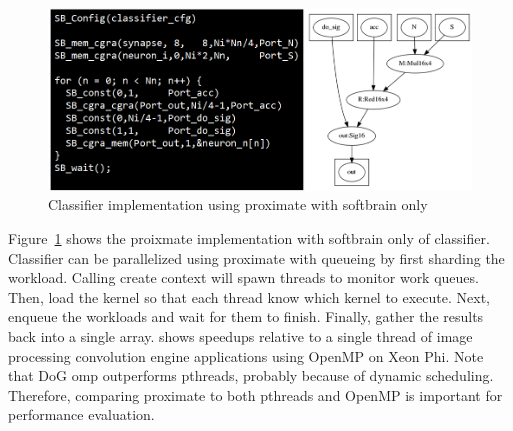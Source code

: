 \begin{figure}
  \begin{center}
    \includegraphics[width=\linewidth]{cs758-figs/classifier-prx_sb_only.png}
  \end{center}
\vspace{-0.2in}
  \caption{Classifier implementation using proximate with softbrain only}
  \label{fig:classifier-prx_sb_only}
\vspace{-0.05in}
\end{figure}

Figure~\ref{fig:classifier-prx_sb_only} shows the proixmate implementation 
with softbrain only of classifier. Classifier can be parallelized 
using proximate with queueing by first sharding the workload. Calling create context 
will spawn threads to monitor work queues. Then, load the kernel so that each thread
know which kernel to execute. Next, enqueue the workloads and wait for them to finish. 
Finally, gather the results back into a single array. 
shows speedups relative to a single 
thread of image processing convolution engine applications using OpenMP on Xeon 
Phi. Note that DoG omp outperforms pthreads, probably because of dynamic 
scheduling. Therefore, comparing proximate to both pthreads and OpenMP is 
important for performance evaluation. 
